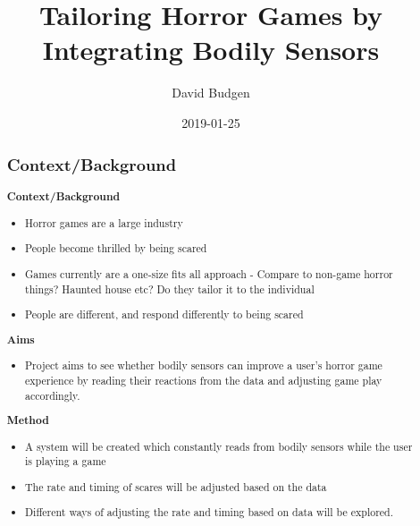 \documentclass[12pt,a4paper]{article}
\title{Tailoring Horror Games by Integrating Bodily Sensors}
\author{David Budgen}
\date{2019-01-25}
\begin{document}
\maketitle

\begin{abstract}


\subsection{Context/Background}
	
\textbf{Context/Background}
	\begin{itemize}
		\item Horror games are a large industry
		\item People become thrilled by being scared
		\item Games currently are a one-size fits all approach - Compare to non-game horror things? Haunted house etc? Do they tailor it to the individual
		\item People are different, and respond differently to being scared
	\end{itemize}

\textbf{Aims}
	\begin{itemize}
		\item Project aims to see whether bodily sensors can improve a user's horror game experience by reading their reactions from the data and adjusting game play accordingly.
	\end{itemize}

\textbf{Method}
	\begin{itemize}
		\item A system will be created which constantly reads from bodily sensors while the user is playing a game
		\item The rate and timing of scares will be adjusted based on the data 
		\item Different ways of adjusting the rate and timing based on data will be explored.
	\end{itemize}


\end{abstract}
\end{document}
